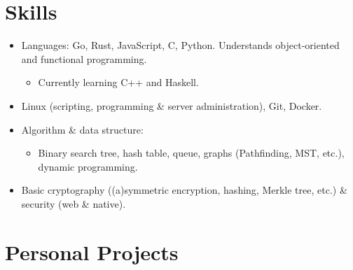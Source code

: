 \documentclass[a4paper]{article}
\begin{document}
  \section{Skills}

  \begin{itemize}[itemsep=0.1\parskip]
    \item Languages: Go, Rust, JavaScript, C, Python. Understands object-oriented and functional programming.

    \begin{itemize}
      \item Currently learning C++ and Haskell.
    \end{itemize}

    \item Linux (scripting, programming \& server administration), Git, Docker.

    \item Algorithm \& data structure:

    \begin{itemize}
      \item Binary search tree, hash table, queue, graphs (Pathfinding, MST, etc.), dynamic programming.
    \end{itemize}

    \item Basic cryptography ((a)symmetric encryption, hashing, Merkle tree, etc.) \& security (web \& native).

  \end{itemize}

  \section{Personal Projects}

  \def\ghurl#1{%
    \href{#1}{({\blueghicon{}})}%
  }
\end{document}
